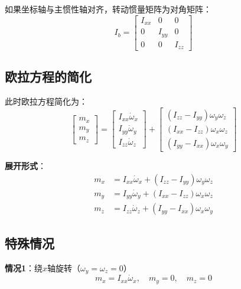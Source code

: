 \documentclass[12pt,a4paper]{article}
\begin{document}
如果坐标轴与主惯性轴对齐，转动惯量矩阵为对角矩阵：
\begin{equation}
I_b = \begin{bmatrix}
I_{xx} & 0 & 0 \\
0 & I_{yy} & 0 \\
0 & 0 & I_{zz}
\end{bmatrix}
\end{equation}

\subsection{欧拉方程的简化}

此时欧拉方程简化为：
\begin{equation}
\begin{bmatrix}
m_x \\
m_y \\
m_z
\end{bmatrix} = \begin{bmatrix}
I_{xx} \dot{\omega}_x \\
I_{yy} \dot{\omega}_y \\
I_{zz} \dot{\omega}_z
\end{bmatrix} + \begin{bmatrix}
(I_{zz} - I_{yy}) \omega_y \omega_z \\
(I_{xx} - I_{zz}) \omega_x \omega_z \\
(I_{yy} - I_{xx}) \omega_x \omega_y
\end{bmatrix}
\label{eq:euler_principal_axes}
\end{equation}

\textbf{展开形式}：
\begin{align}
m_x &= I_{xx} \dot{\omega}_x + (I_{zz} - I_{yy}) \omega_y \omega_z \\
m_y &= I_{yy} \dot{\omega}_y + (I_{xx} - I_{zz}) \omega_x \omega_z \\
m_z &= I_{zz} \dot{\omega}_z + (I_{yy} - I_{xx}) \omega_x \omega_y
\end{align}

\subsection{特殊情况}

\textbf{情况1}：绕$x$轴旋转（$\omega_y = \omega_z = 0$）
\begin{equation}
m_x = I_{xx} \dot{\omega}_x, \quad m_y = 0, \quad m_z = 0
\end{equation}
\end{document}
